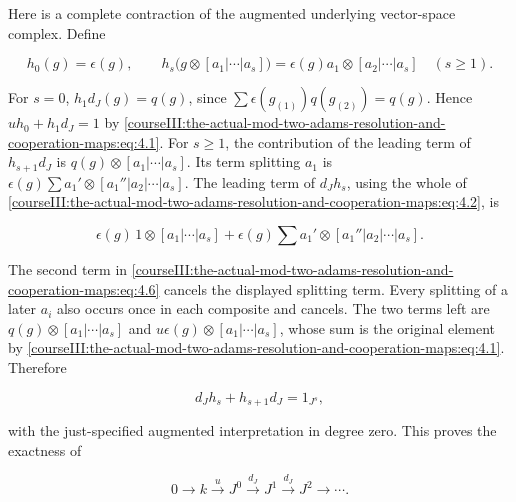 Here is a complete contraction of the augmented underlying vector-space complex. Define

\begin{equation}
h_0(g)=\epsilon(g),\qquad
 h_s\bigl(g\otimes[a_1|\cdots|a_s]\bigr)
   =\epsilon(g)a_1\otimes[a_2|\cdots|a_s]\quad(s\geq1).
 \label{courseIII:the-actual-mod-two-adams-resolution-and-cooperation-maps:eq:4.5}
\end{equation}

For \(s=0\), \(h_1d_J(g)=q(g)\), since \(\sum\epsilon(g_{(1)})q(g_{(2)})=q(g)\). Hence \(u h_0+h_1d_J=1\) by \eqref{courseIII:the-actual-mod-two-adams-resolution-and-cooperation-maps:eq:4.1}. For \(s\geq1\), the contribution of the leading term of \(h_{s+1}d_J\) is \(q(g)\otimes[a_1|\cdots|a_s]\). Its term splitting \(a_1\) is
\(\epsilon(g)\sum a_1'\otimes[a_1''|a_2|\cdots|a_s]\).
The leading term of \(d_Jh_s\), using the whole of \eqref{courseIII:the-actual-mod-two-adams-resolution-and-cooperation-maps:eq:4.2}, is

\begin{equation}
\epsilon(g)\,1\otimes[a_1|\cdots|a_s]
 +\epsilon(g)\sum a_1'\otimes[a_1''|a_2|\cdots|a_s].
 \label{courseIII:the-actual-mod-two-adams-resolution-and-cooperation-maps:eq:4.6}
\end{equation}

The second term in \eqref{courseIII:the-actual-mod-two-adams-resolution-and-cooperation-maps:eq:4.6} cancels the displayed splitting term. Every splitting of a later \(a_i\) also occurs once in each composite and cancels. The two terms left are \(q(g)\otimes[a_1|\cdots|a_s]\) and \(u\epsilon(g)\otimes[a_1|\cdots|a_s]\), whose sum is the original element by \eqref{courseIII:the-actual-mod-two-adams-resolution-and-cooperation-maps:eq:4.1}. Therefore

\begin{equation}
d_Jh_s+h_{s+1}d_J=1_{J^s},
 \label{courseIII:the-actual-mod-two-adams-resolution-and-cooperation-maps:eq:4.7}
\end{equation}

with the just-specified augmented interpretation in degree zero. This proves the exactness of

\begin{equation}
0\longrightarrow k\xrightarrow{u}J^0\xrightarrow{d_J}J^1
       \xrightarrow{d_J}J^2\longrightarrow\cdots.
 \label{courseIII:the-actual-mod-two-adams-resolution-and-cooperation-maps:eq:4.8}
\end{equation}

